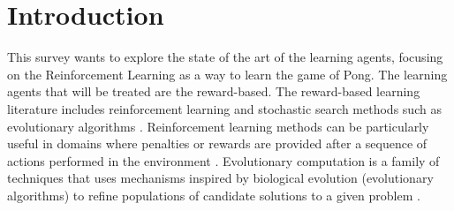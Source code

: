\section{Introduction}
This survey wants to explore the state of the art of the learning agents, focusing on the Reinforcement Learning as a way to learn the game of Pong.
%
The learning agents that will be treated are the reward-based.
The reward-based learning literature includes reinforcement learning and stochastic search methods such as evolutionary algorithms \cite{panait2005cooperative}.
%
Reinforcement learning methods can be particularly useful in domains where penalties or rewards are provided after a sequence of actions performed in the environment \cite{panait2005cooperative}.
%
Evolutionary computation is a family of techniques that uses mechanisms inspired by biological evolution (evolutionary algorithms) to refine populations of candidate solutions to a given problem \cite{vikhar2016evolutionary}.

